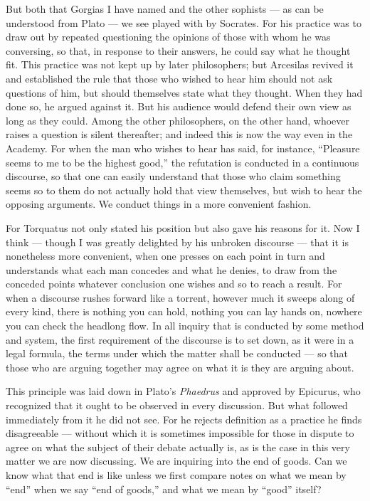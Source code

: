  But both that Gorgias I have named and the other sophists — as can be understood from Plato — we see played with by Socrates. For his practice was to draw out by repeated questioning the opinions of those with whom he was conversing, so that, in response to their answers, he could say what he thought fit. This practice was not kept up by later philosophers; but Arcesilas revived it and established the rule that those who wished to hear him should not ask questions of him, but should themselves state what they thought. When they had done so, he argued against it. But his audience would defend their own view as long as they could. Among the other philosophers, on the other hand, whoever raises a question is silent thereafter; and indeed this is now the way even in the Academy. For when the man who wishes to hear has said, for instance, ``Pleasure seems to me to be the highest good,'' the refutation is conducted in a continuous discourse, so that one can easily understand that those who claim something seems so to them do not actually hold that view themselves, but wish to hear the opposing arguments. We conduct things in a more convenient fashion.

 For Torquatus not only stated his position but also gave his reasons for it. Now I think — though I was greatly delighted by his unbroken discourse — that it is nonetheless more convenient, when one presses on each point in turn and understands what each man concedes and what he denies, to draw from the conceded points whatever conclusion one wishes and so to reach a result. For when a discourse rushes forward like a torrent, however much it sweeps along of every kind, there is nothing you can hold, nothing you can lay hands on, nowhere you can check the headlong flow. In all inquiry that is conducted by some method and system, the first requirement of the discourse is to set down, as it were in a legal formula, the terms under which the matter shall be conducted — so that those who are arguing together may agree on what it is they are arguing about.

 This principle was laid down in Plato's \textit{Phaedrus} and approved by Epicurus, who recognized that it ought to be observed in every discussion. But what followed immediately from it he did not see. For he rejects definition as a practice he finds disagreeable — without which it is sometimes impossible for those in dispute to agree on what the subject of their debate actually is, as is the case in this very matter we are now discussing. We are inquiring into the end of goods. Can we know what that end is like unless we first compare notes on what we mean by ``end'' when we say ``end of goods,'' and what we mean by ``good'' itself?

